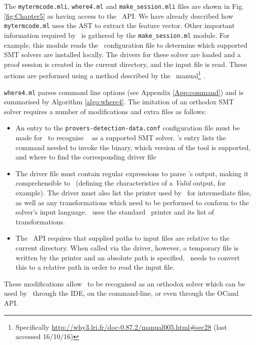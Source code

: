 The \texttt{mytermcode.mli}, \texttt{where4.ml} and \texttt{make\_session.mli} files are shown in Fig. \ref{fig:Chapter5} as having access to the \why~API. 
We have already described how \texttt{mytermcode.ml} uses the AST to extract the feature vector.
Other important information required by \why~is gathered by the \texttt{make\_session.ml} module.
For example, this module reads the \why~configuration file to determine which supported SMT solvers are installed locally.
The drivers for these solver are loaded and a proof session is created in the current directory, and the input file is read.
These actions are performed using a method described by the \why~manual\footnote{Specifically \url{http://why3.lri.fr/doc-0.87.2/manual005.html\#sec28} (last accessed 16/10/16)} \cite{why:manual}.

\texttt{where4.ml} parses command line options (see Appendix \ref{App:command}) and is summarised by Algorithm \ref{algo:where4}.
The imitation of an orthodox SMT solver requires a number of modifications and extra files as follows:
\begin{itemize}
	\item An entry to the \texttt{provers-detection-data.conf} configuration file must be made for \why~to recognise \where~ as a supported SMT solver.
	\where's entry lists the command needed to invoke the binary, which version of the tool is supported, and where to find the corresponding driver file
	\item The driver file must contain regular expressions to parse \where's output, making it comprehensible to \why~(defining the characteristics of a \textit{Valid} output, for example). 
	The driver must also list the printer used by \why~for intermediate files, as well as any transformations which need to be performed to conform to the solver's input language. \where~uses the standard \why~printer and its list of transformations.
	\item The \why~API requires that supplied paths to input files are relative to the current directory. When called via the driver, however, a temporary file is written by the printer and an absolute path is specified. \where~needs to convert this to a relative path in order to read the input file.     
\end{itemize}

These modifications allow \where~to be recognised as an orthodox solver which can be used by \why~through the IDE, on the command-line, or even through the OCaml API. 

